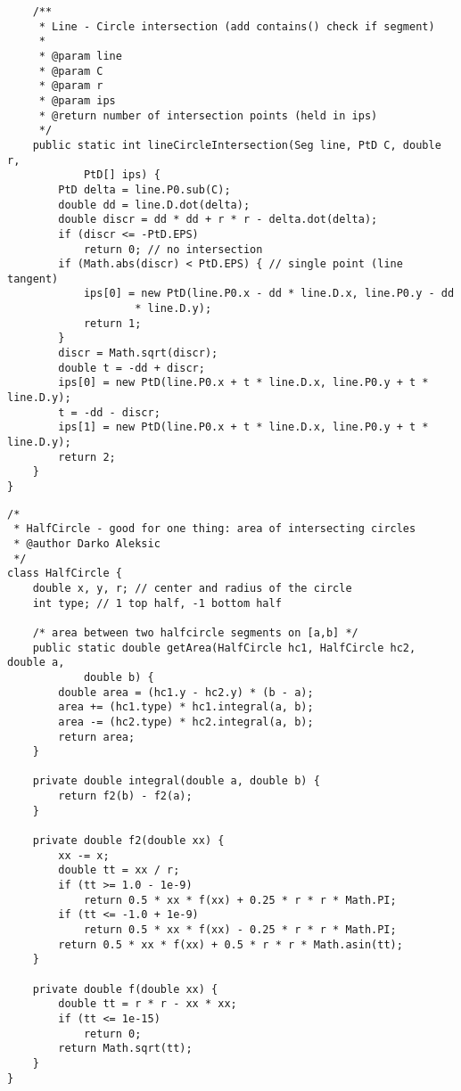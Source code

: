 \documentclass{article}
\begin{document}
    \begin{verbatim}
    /**
     * Line - Circle intersection (add contains() check if segment)
     * 
     * @param line
     * @param C
     * @param r
     * @param ips
     * @return number of intersection points (held in ips)
     */
    public static int lineCircleIntersection(Seg line, PtD C, double r,
            PtD[] ips) {
        PtD delta = line.P0.sub(C);
        double dd = line.D.dot(delta);
        double discr = dd * dd + r * r - delta.dot(delta);
        if (discr <= -PtD.EPS)
            return 0; // no intersection
        if (Math.abs(discr) < PtD.EPS) { // single point (line tangent)
            ips[0] = new PtD(line.P0.x - dd * line.D.x, line.P0.y - dd
                    * line.D.y);
            return 1;
        }
        discr = Math.sqrt(discr);
        double t = -dd + discr;
        ips[0] = new PtD(line.P0.x + t * line.D.x, line.P0.y + t * line.D.y);
        t = -dd - discr;
        ips[1] = new PtD(line.P0.x + t * line.D.x, line.P0.y + t * line.D.y);
        return 2;
    }
}

    \end{verbatim}
    \begin{verbatim}
/*
 * HalfCircle - good for one thing: area of intersecting circles
 * @author Darko Aleksic
 */
class HalfCircle {
    double x, y, r; // center and radius of the circle
    int type; // 1 top half, -1 bottom half

    /* area between two halfcircle segments on [a,b] */
    public static double getArea(HalfCircle hc1, HalfCircle hc2, double a,
            double b) {
        double area = (hc1.y - hc2.y) * (b - a);
        area += (hc1.type) * hc1.integral(a, b);
        area -= (hc2.type) * hc2.integral(a, b);
        return area;
    }

    private double integral(double a, double b) {
        return f2(b) - f2(a);
    }

    private double f2(double xx) {
        xx -= x;
        double tt = xx / r;
        if (tt >= 1.0 - 1e-9)
            return 0.5 * xx * f(xx) + 0.25 * r * r * Math.PI;
        if (tt <= -1.0 + 1e-9)
            return 0.5 * xx * f(xx) - 0.25 * r * r * Math.PI;
        return 0.5 * xx * f(xx) + 0.5 * r * r * Math.asin(tt);
    }

    private double f(double xx) {
        double tt = r * r - xx * xx;
        if (tt <= 1e-15)
            return 0;
        return Math.sqrt(tt);
    }
}
    \end{verbatim}
\end{document}
